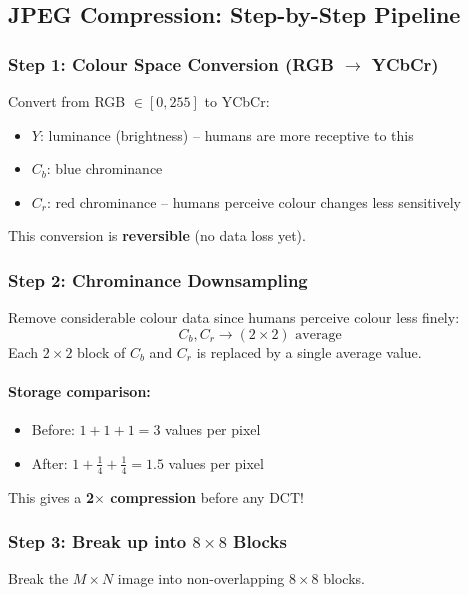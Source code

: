 \documentclass[12pt,a4paper]{article}
\begin{document}
\subsection{JPEG Compression: Step-by-Step Pipeline}

\subsubsection{Step 1: Colour Space Conversion (RGB $\to$ YCbCr)}

Convert from RGB $\in [0,255]$ to YCbCr:
\begin{itemize}
  \item $Y$: luminance (brightness) -- humans are more receptive to this
  \item $C_b$: blue chrominance
  \item $C_r$: red chrominance -- humans perceive colour changes less sensitively
\end{itemize}
This conversion is \textbf{reversible} (no data loss yet).

\subsubsection{Step 2: Chrominance Downsampling}

Remove considerable colour data since humans perceive colour less finely:
\[
  C_b, C_r \to (2\times2)\text{ average}
\]
Each $2\times2$ block of $C_b$ and $C_r$ is replaced by a single average value.

\paragraph{Storage comparison:}
\begin{itemize}
  \item Before: $1 + 1 + 1 = 3$ values per pixel
  \item After: $1 + \frac{1}{4} + \frac{1}{4} = 1.5$ values per pixel
\end{itemize}
This gives a \textbf{2$\times$ compression} before any DCT!

\subsubsection{Step 3: Break up into $8\times8$ Blocks}

Break the $M\times N$ image into non-overlapping $8\times8$ blocks.
\end{document}
